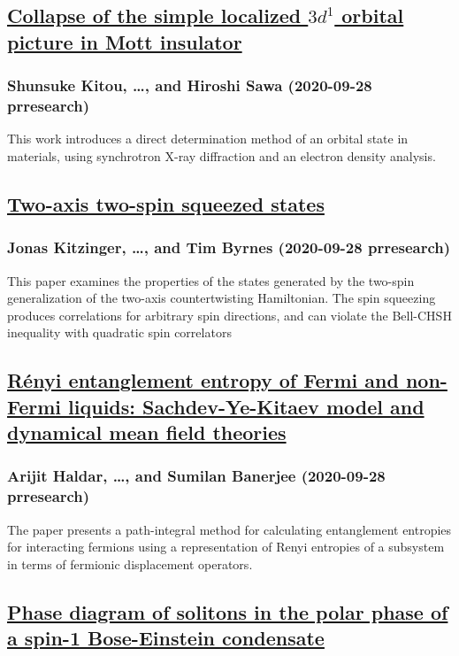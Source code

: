 \subsection*{\href{http://link.aps.org/doi/10.1103/PhysRevResearch.2.033503}{Collapse of the simple localized $3{d}^{1}$ orbital picture in Mott insulator}}
\subsubsection*{Shunsuke Kitou, \dots, and Hiroshi Sawa (2020-09-28 prresearch)}
This work introduces a direct determination method of an orbital state in materials, using synchrotron X-ray diffraction and an electron density analysis.
\subsection*{\href{http://link.aps.org/doi/10.1103/PhysRevResearch.2.033504}{Two-axis two-spin squeezed states}}
\subsubsection*{Jonas Kitzinger, \dots, and Tim Byrnes (2020-09-28 prresearch)}
This paper examines the properties of the states generated by the two-spin generalization of the two-axis countertwisting Hamiltonian. The spin squeezing produces correlations for arbitrary spin directions, and can violate the Bell-CHSH inequality with quadratic spin correlators
\subsection*{\href{http://link.aps.org/doi/10.1103/PhysRevResearch.2.033505}{Rényi entanglement entropy of Fermi and non-Fermi liquids: Sachdev-Ye-Kitaev model and dynamical mean field theories}}
\subsubsection*{Arijit Haldar, \dots, and Sumilan Banerjee (2020-09-28 prresearch)}
The paper presents a path-integral method for calculating entanglement entropies for interacting fermions using a representation of Renyi entropies of a subsystem in terms of fermionic displacement operators.
\subsection*{\href{http://link.aps.org/doi/10.1103/PhysRevResearch.2.033506}{Phase diagram of solitons in the polar phase of a spin-1 Bose-Einstein condensate}}
